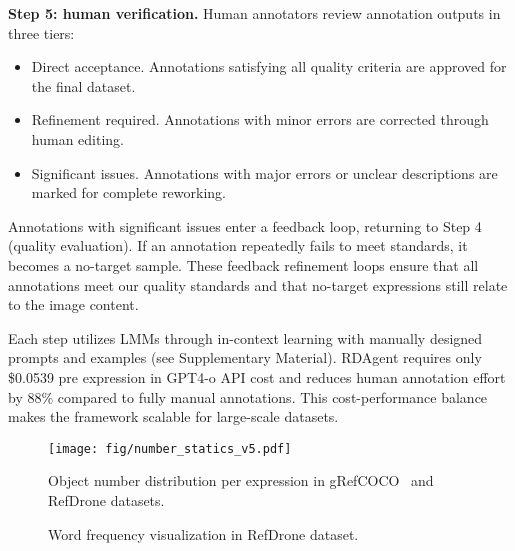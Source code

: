\textbf{Step 5: human verification.} Human annotators review annotation outputs in three tiers:
\begin{itemize} 
\item Direct acceptance. Annotations satisfying all quality criteria are approved for the final dataset.
\item Refinement required. Annotations with minor errors are corrected through human editing.
\item Significant issues. Annotations with major errors or unclear descriptions are marked for complete reworking.

\end{itemize}
Annotations with significant issues enter a feedback loop, returning to Step 4 (quality evaluation). If an annotation repeatedly fails to meet standards, it becomes a no-target sample. These feedback refinement loops ensure that all annotations meet our quality standards and that no-target expressions still relate to the image content. 
\par
Each step utilizes LMMs through in-context learning with manually designed prompts and examples (see Supplementary Material). RDAgent requires only \$0.0539 pre expression in GPT4-o API cost and reduces human annotation effort by 88\% compared to fully manual annotations. This cost-performance balance makes the framework scalable for large-scale datasets.




\begin{figure}[t]
\centering
\texttt{[image: fig/number\_statics\_v5.pdf]}
\caption{Object number distribution per expression in gRefCOCO~\cite{grefcoco} and RefDrone datasets.
} 
\label{fig:data_statistics}
\end{figure}

\begin{figure}[t]
    \centering
    \caption{Word frequency visualization in RefDrone dataset.}
    \label{fig:words_cloud}
\end{figure}


